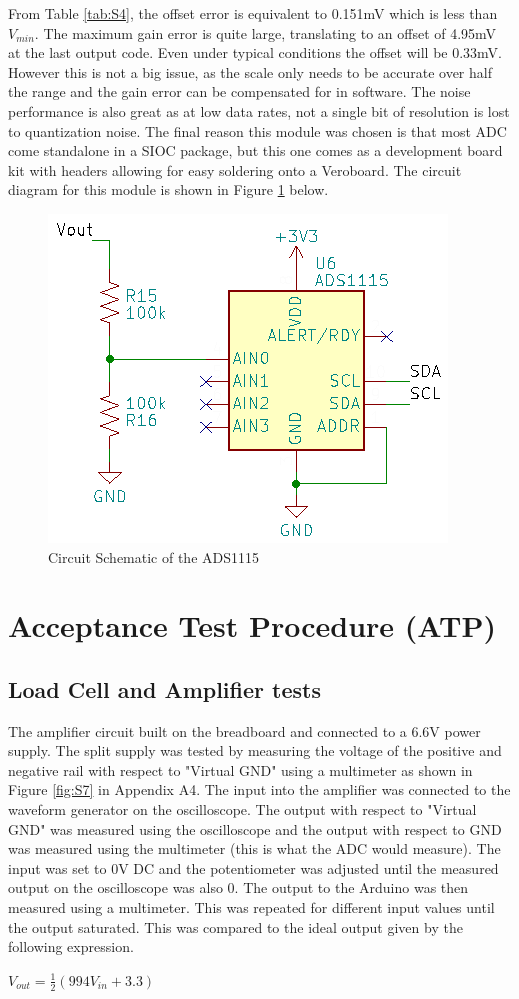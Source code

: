 \documentclass[class=report,11pt,crop=false]{standalone}
\begin{document}
	From Table \ref{tab:S4}, the offset error is equivalent to 0.151mV which is less than $V_{min}$. The maximum gain error is quite large, translating to an offset of 4.95mV at the last output code. Even under typical conditions the offset will be 0.33mV. However this is not a big issue, as the scale only needs to be accurate over half the range and the gain error can be compensated for in software. The noise performance is also great as at low data rates, not a single bit of resolution is lost to quantization noise. The final reason this module was chosen is that most ADC come standalone in a SIOC package, but this one comes as a development board kit with headers allowing for easy soldering onto a Veroboard. The circuit diagram for this module is shown in Figure \ref{fig:S6} below.
	\begin{figure}[h!]
		\centering
		\includegraphics[width=0.4\linewidth]{Figures/ADC.png}
		\caption{Circuit Schematic of the ADS1115}
		\label{fig:S6}
	\end{figure}
	
	\section{Acceptance Test Procedure (ATP)}
	\subsection{Load Cell and Amplifier tests}
	The amplifier circuit built on the breadboard and connected to a 6.6V power supply. The split supply was tested by measuring the voltage of the positive and negative rail with respect to "Virtual GND" using a multimeter as shown in Figure \ref{fig:S7} in Appendix A4.
	The input into the amplifier was connected to the waveform generator on the oscilloscope. The output with respect to "Virtual GND" was measured using the oscilloscope and the output with respect to GND was measured using the multimeter (this is what the ADC would measure). The input was set to 0V DC and the potentiometer was adjusted until the measured output on the oscilloscope was also 0. The output to the Arduino was then measured using a multimeter. This was repeated for different input values until the output saturated. This was compared to the ideal output given by the following expression.
	\begin{center}
		$V_{out}=\frac{1}{2}\left(994V_{in} + 3.3\right)$ \\
	\end{center}
	
\end{document}
